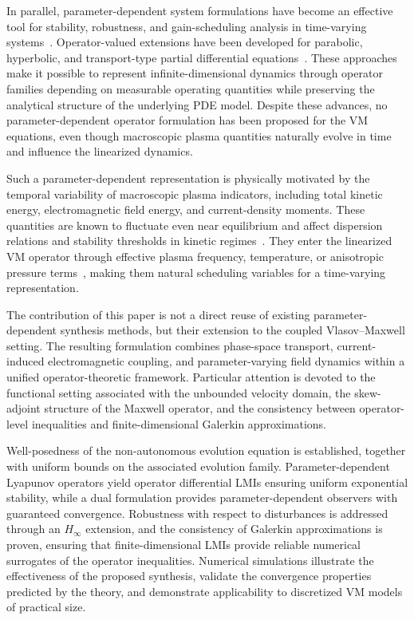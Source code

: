 \documentclass[AMA,Times2COL]{WileyNJDv5}
\begin{document}
In parallel, parameter-dependent system formulations have become an effective tool for stability, robustness, and gain-scheduling analysis in time-varying systems~\cite{chesi2005polynomially,a2019computational,
jetto2010efficient,wu2001lpv}.
Operator-valued extensions have been developed for parabolic, hyperbolic, and transport-type partial differential equations~\cite{apkarian2000parameterized,coron2007strict,
mironchenko2017characterizations}.
These approaches make it possible to represent infinite-dimensional dynamics through operator families depending on measurable operating quantities while preserving the analytical structure of the underlying PDE model.
Despite these advances, no parameter-dependent operator formulation has been proposed for the VM equations, even though macroscopic plasma quantities naturally evolve in time and influence the linearized dynamics.

Such a parameter-dependent representation is physically  motivated by the temporal variability of macroscopic plasma indicators, including total kinetic energy, electromagnetic field energy, and current-density moments.
These quantities are known to fluctuate even near equilibrium and affect dispersion relations and stability thresholds in kinetic regimes~\cite{pezzi2018velocity,kamaletdinov2024nonlinear,
ghizzo2024collisionless}.
They enter the linearized VM operator through effective plasma frequency, temperature, or anisotropic pressure
terms~\cite{brizard2007foundations,arro2022spectral}, making them natural scheduling variables for a time-varying representation.

The contribution of this paper is not a direct reuse of existing parameter-dependent synthesis methods, but their extension to the coupled Vlasov--Maxwell setting. The resulting formulation combines phase-space transport, current-induced electromagnetic coupling, and parameter-varying field dynamics within a unified operator-theoretic framework. Particular attention is devoted to the functional setting associated with the unbounded velocity domain, the skew-adjoint structure of the Maxwell operator, and the consistency between operator-level inequalities and finite-dimensional Galerkin approximations.

Well-posedness of the non-autonomous evolution equation is established, together with uniform bounds on the associated evolution family.
Parameter-dependent Lyapunov operators yield operator differential LMIs ensuring uniform exponential stability, while a dual formulation provides parameter-dependent observers with guaranteed convergence.
Robustness with respect to disturbances is addressed through an $H_\infty$ extension, and the consistency of Galerkin approximations is proven, ensuring that finite-dimensional LMIs provide reliable numerical surrogates of the operator inequalities.
Numerical simulations illustrate the effectiveness of the proposed synthesis, validate the convergence properties predicted by the theory, and demonstrate applicability to discretized VM models of practical size.
\end{document}
